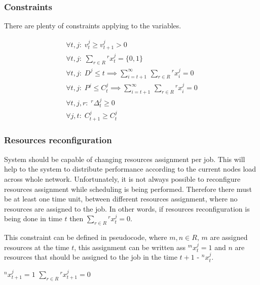 \subsubsection{Constraints}
There are plenty of constraints applying to the variables.

\begin{align*}
	\forall t, j:\; v_{t}^{j} \geq v_{t+1}^{j} > 0                                                              \\     
	\forall t, j:\; \sum_{r \in R} {}^{r}x_{t}^{j} = \{0, 1\}                                                   \\
	\forall t, j:\; D^{j} \leq t \implies \sum_{i = t+1}^{\infty} \, \sum_{r \in R} {}^{r}x_{i}^{j} = 0         \\
	\forall t, j:\; P^{j} \leq C_{t}^{j} \implies \sum_{i = t+1}^{\infty} \, \sum_{r \in R} {}^{r}x_{i}^{j} = 0 \\
	\forall t, j, r:\; {}^{r}\Delta_{t}^{j} \geq 0                                                              \\
	\forall j, t:\; C_{t+1}^{j} \geq C_{t}^{j}                                                                  
\end{align*}

\subsubsection{Resources reconfiguration}
System should be capable of changing resources assignment per job.
This will help to the system to distribute performance according to the current nodes load across whole network.
Unfortunately, it is not always possible to reconfigure resources assignment while scheduling is being performed.
Therefore there must be at least one time unit, between different resources assignment,
where no resources are assigned to the job.
In other words, if resources reconfiguration is being done in time $t$ then $\sum_{r \in R} {}^{r}x_{t}^{j} = 0$.

This constraint can be defined in pseudocode,
where $m, n \in R$, $m$ are assigned resources at the time $t$,
this assignment can be written ass  ${}^{m}x_{t}^{j} = 1$
and $n$ are resources that should be assigned to the job in the time $t+1$ - ${}^{n}x_{t}^{j}$.

\begin{samepage}
	\begin{algorithmic}
		\STATE ${}^{n}x_{t+1}^{j} = 1$
		\ELSE
		\STATE $\sum_{r \in R} {}^{r}x_{t+1}^{j} = 0$
		\ENDIF 
		\ENDIF 
	\end{algorithmic}        
\end{samepage}

